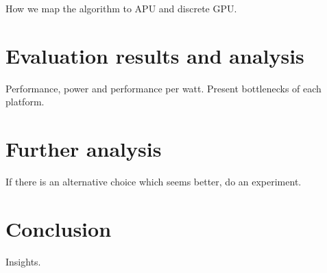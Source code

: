 How we map the algorithm to APU and discrete GPU.

\section{Evaluation results and analysis}

Performance, power and performance per watt. Present bottlenecks of each platform.

\section{Further analysis}

If there is an alternative choice which seems better, do an experiment.

\section{Conclusion}

Insights.



